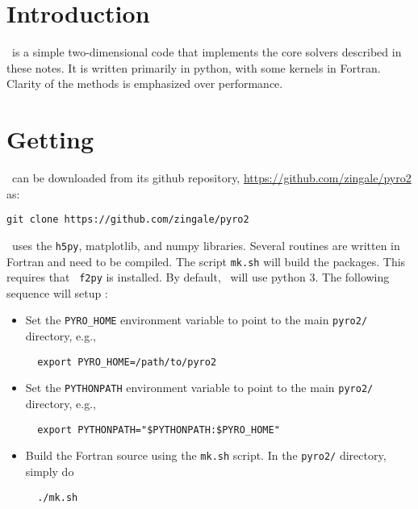 \label{app:pyro}



\section{Introduction}

\pyro\ is a simple two-dimensional code that implements the core
solvers described in these notes.  It is written primarily in python,
with some kernels in Fortran.  Clarity of the methods is emphasized
over performance.


\section{Getting \pyro}

\pyro\ can be downloaded from its github repository, \url{https://github.com/zingale/pyro2} as:
\begin{verbatim}
git clone https://github.com/zingale/pyro2
\end{verbatim}

\pyro\ uses the {\tt h5py}, {\sf matplotlib}, and {\sf numpy} libraries.
Several routines are written in Fortran and need to be compiled.  The
script {\tt mk.sh} will build the packages.  This requires that {\tt
f2py} is installed.  By default, \pyro\ will use python 3.  
The following sequence will setup \pyro:
\begin{itemize}
\item Set the {\tt PYRO\_HOME} environment variable to point to the
  main {\tt pyro2/} directory, e.g.,
  \begin{verbatim}
  export PYRO_HOME=/path/to/pyro2
  \end{verbatim}

\item Set the {\tt PYTHONPATH} environment variable to point to the
  main {\tt pyro2/} directory, e.g.,
  \begin{verbatim}
  export PYTHONPATH="$PYTHONPATH:$PYRO_HOME"
  \end{verbatim}

\item Build the Fortran source using the {\tt mk.sh} script.  In the
  {\tt pyro2/} directory, simply do
  \begin{verbatim}
  ./mk.sh
  \end{verbatim}
\end{itemize}



